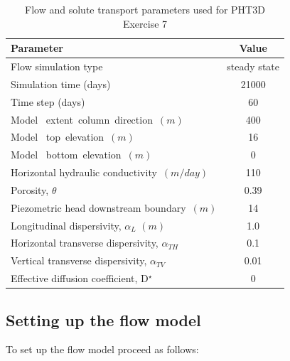 \begin{table}[hb]
\caption{Flow and solute transport parameters used for PHT3D Exercise 7}
\begin{center}
\begin{tabular}{lc} 
\toprule
Parameter                                            &         Value \\
\midrule
Flow simulation type                                 &        steady state \\
Simulation time (days)                               &  21000           \\
Time step (days)                               &  60           \\
Model \  extent\ column\ direction\ $ (m)$           &  400            \\
Model \ top\ elevation\ $(m)$                        &   16            \\
Model \ bottom\ elevation\ $(m)$                        &   0            \\
Horizontal hydraulic conductivity\ $(m/day)$         &   110     \\ 
Porosity, $\theta$                                   &           0.39  \\
Piezometric head downstream boundary\ $(m) $         &  14            \\ 
Longitudinal dispersivity, $\alpha_L$   $(m)$             &           1.0 \\
Horizontal transverse dispersivity, $\alpha_{TH}$    &           0.1 \\
Vertical transverse dispersivity,   $\alpha_{TV}$    &           0.01 \\
Effective diffusion coefficient, D$^{\star}$          &             0  \\
\bottomrule

\end{tabular}
\label{single_spec_table_1}
\end{center}
\end{table}

\subsection{Setting up the flow model}

To set up the flow model proceed as follows:

